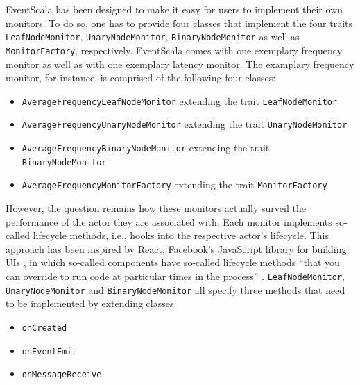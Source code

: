\documentclass[article, 10pt, type=bsc, colorback, accentcolor=tud8b, parskip=half, bibliography=totocnumbered]{tudthesis}
\begin{document}
EventScala has been designed to make it easy for users to implement their own monitors.
To do so, one has to provide four classes that implement the four traits \lstinline{LeafNodeMonitor}, \lstinline{UnaryNodeMonitor}, \lstinline{BinaryNodeMonitor} as well as \lstinline{MonitorFactory}, respectively.
EventScala comes with one exemplary frequency monitor as well as with one exemplary latency monitor. The examplary frequency monitor, for instance, is comprised of the following four classes:

\begin{itemize}
\item
\lstinline{AverageFrequencyLeafNodeMonitor} extending the trait \lstinline{LeafNodeMonitor}
\item
\lstinline{AverageFrequencyUnaryNodeMonitor} extending the trait \lstinline{UnaryNodeMonitor}
\item
\lstinline{AverageFrequencyBinaryNodeMonitor} extending the trait \lstinline{BinaryNodeMonitor}
\item
\lstinline{AverageFrequencyMonitorFactory} extending the trait \lstinline{MonitorFactory}
\end{itemize}

However, the question remains how these monitors actually surveil the performance of the actor they are associated with.
Each monitor implements so-called lifecycle methods, i.e., hooks into the respective actor's lifecycle.
This approach has been inspired by React, Facebook's JavaScript library for building UIs \cite{react}, in which so-called components have so-called lifecycle methods ``that you can override to run code at particular times in the process'' \cite{reactcomponent}.
\lstinline{LeafNodeMonitor}, \lstinline{UnaryNodeMonitor} and \lstinline{BinaryNodeMonitor} all specify three methods that need to be implemented by extending classes:

\begin{itemize}
\item
\lstinline{onCreated}
\item
\lstinline{onEventEmit}
\item
\lstinline{onMessageReceive}
\end{itemize}
\end{document}
